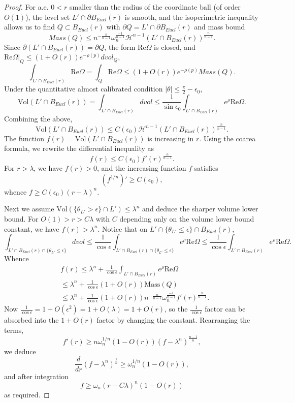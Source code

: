 \documentclass[a4paper]{article}
\theoremstyle{definition}
\begin{document}
\begin{proof}
For a.e. $0<r$ smaller than the radius of the coordinate ball (of order $O(1)$), the level set $ L'\cap \partial B_{Eucl}(r)$ is smooth, and the isoperimetric inequality allows us to find $Q\subset B_{Eucl}(r)$ with $\partial Q=L'\cap \partial B_{Eucl}(r)$ and mass bound
\[
Mass(Q) \leq 
n^{ -\frac{n}{n-1}  } \omega_n^{\frac{-1}{n-1}}
 \mathcal{H}^{n-1}(L'\cap B_{Eucl}(r))^{\frac{n}{n-1}}.
\]
Since $\partial (L'\cap B_{Eucl}(r))= \partial Q$, the form $\text{Re}\Omega$ is closed, and $\text{Re}\Omega |_Q \leq (1+O(r))e^{-\rho(p)} dvol_Q$,
\[
\int_{ L'\cap B_{Eucl}(r)} \text{Re} \Omega = \int_{ Q} \text{Re}\Omega \leq (1+O(r))e^{-\rho(p)} Mass(Q).
\]
Under the quantitative almost calibrated condition $|\theta|\leq \frac{\pi}{2}-\epsilon_0$,
\[
\text{Vol}(L'\cap  B_{Eucl}(r)  ) = \int_{ L'\cap B_{Eucl}(r)} dvol \leq \frac{1}{\sin \epsilon_0} \int_{ L'\cap B_{Eucl}(r)}  e^{\rho}\text{Re} \Omega .
\]
Combining the above,
\[
\text{Vol}(L'\cap  B_{Eucl}(r)  )\leq C(\epsilon_0) \mathcal{H}^{n-1}(L'\cap B_{Eucl}(r))^{\frac{n}{n-1}}.
\]
The function $f(r)= \text{Vol}(L'\cap  B_{Eucl}(r)  )$ is increasing in $r$. 
Using the coarea formula, we rewrite the differential inequality as
\[
f(r)\leq C(\epsilon_0) f'(r)^{  \frac{n}{n-1} }.
\]
For $r>\lambda$, we have $f(r)>0$, and the increasing function $f$ satisfies
\[
(f^{1/n})' \geq C(\epsilon_0),
\]
whence $f\geq C(\epsilon_0) (r-\lambda)^n$.



Next we assume $\text{Vol}( \{ \theta_{L'}> \epsilon   \}\cap L' ) \leq \lambda^n $ and deduce the sharper volume lower bound. For $O(1)>r> C\lambda$ with $C$ depending only on the volume lower bound constant, we have  $f(r) >\lambda^n  $.
Notice that on $L'\cap \{ \theta_{L'}\leq  \epsilon   \}\cap B_{Eucl}(r)$,
\[
\int_{ L'\cap B_{Eucl}(r)\cap \{ \theta_{L'}\leq  \epsilon   \}} dvol \leq \frac{1}{\cos \epsilon} \int_{ L'\cap B_{Eucl}(r)\cap \{ \theta_{L'}\leq  \epsilon   \}} e^\rho \text{Re} \Omega \leq \frac{1}{\cos \epsilon} \int_{ L'\cap B_{Eucl}(r)} e^\rho \text{Re} \Omega  .
\]
Whence 
\[
\begin{split}
& f(r)\leq \lambda^n+ \frac{1}{\cos \epsilon} \int_{ L'\cap B_{Eucl}(r)} e^\rho \text{Re} \Omega \\
&
\leq 
\lambda^n+ \frac{1}{\cos \epsilon} (1+O(r)) \text{Mass}(Q)\\
&\leq 
\lambda^n+  \frac{1}{\cos \epsilon} (1+O(r))  n^{ -\frac{n}{n-1}  } \omega_n^{\frac{-1}{n-1}}
f'(r)^{ \frac{n}{n-1} }  .
\end{split}
\]
Now $\frac{1}{\cos \epsilon} = 1+O(\epsilon^2) =1+O(\lambda)=1+O(r)$, so the  $ \frac{1}{\cos \epsilon}$ factor can be absorbed into the $1+O(r)$ factor by changing the constant. Rearranging the terms, 
\[
f'(r) \geq n \omega_n^{1/n} (1- O(r)) (f-\lambda^n)^{\frac{n-1}{n}},
\]
we deduce
\[
\frac{d}{dr}(f-\lambda^n)^{\frac{1}{n}} \geq \omega_n^{1/n} (1- O(r)),
\]
and after integration
\[
f\geq  \omega_n (r-C\lambda)^n (1- O(r) )
\]
as required.
\end{proof}
\end{document}
